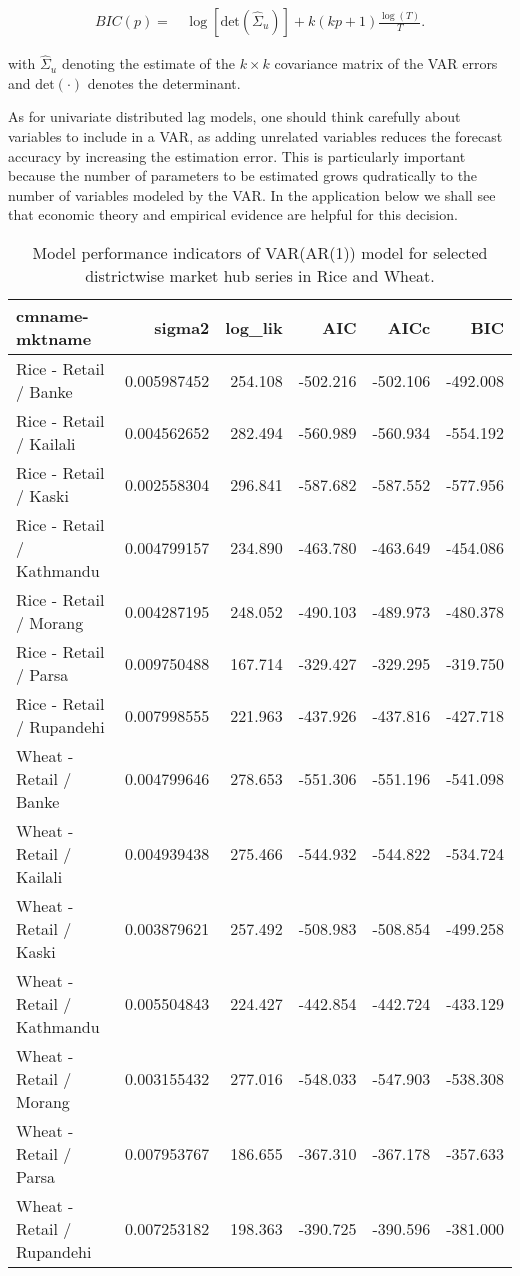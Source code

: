 \documentclass[12pt,]{article}
\begin{document}
\[
\begin{aligned}
  BIC(p) =& \, \log\left[\text{det}(\widehat{\Sigma}_u)\right] + k(kp+1) \frac{\log(T)}{T}.
\end{aligned}
\]

with \(\widehat{\Sigma}_u\) denoting the estimate of the \(k \times k\) covariance matrix of the VAR errors and \(\text{det}(\cdot)\) denotes the determinant.

As for univariate distributed lag models, one should think carefully about variables to include in a VAR, as adding unrelated variables reduces the forecast accuracy by increasing the estimation error. This is particularly important because the number of parameters to be estimated grows qudratically to the number of variables modeled by the VAR. In the application below we shall see that economic theory and empirical evidence are helpful for this decision.

\begin{longtable}[t]{lrrrrr}
\caption{\label{tab:retail-var-fit-tidy}Model performance indicators of VAR(AR(1)) model for selected districtwise market hub series in Rice and Wheat.}\\
\toprule
cmname-mktname & sigma2 & log\_lik & AIC & AICc & BIC\\
\midrule
Rice - Retail / Banke & 0.005987452 & 254.108 & -502.216 & -502.106 & -492.008\\
Rice - Retail / Kailali & 0.004562652 & 282.494 & -560.989 & -560.934 & -554.192\\
Rice - Retail / Kaski & 0.002558304 & 296.841 & -587.682 & -587.552 & -577.956\\
Rice - Retail / Kathmandu & 0.004799157 & 234.890 & -463.780 & -463.649 & -454.086\\
Rice - Retail / Morang & 0.004287195 & 248.052 & -490.103 & -489.973 & -480.378\\
\addlinespace
Rice - Retail / Parsa & 0.009750488 & 167.714 & -329.427 & -329.295 & -319.750\\
Rice - Retail / Rupandehi & 0.007998555 & 221.963 & -437.926 & -437.816 & -427.718\\
Wheat - Retail / Banke & 0.004799646 & 278.653 & -551.306 & -551.196 & -541.098\\
Wheat - Retail / Kailali & 0.004939438 & 275.466 & -544.932 & -544.822 & -534.724\\
Wheat - Retail / Kaski & 0.003879621 & 257.492 & -508.983 & -508.854 & -499.258\\
\addlinespace
Wheat - Retail / Kathmandu & 0.005504843 & 224.427 & -442.854 & -442.724 & -433.129\\
Wheat - Retail / Morang & 0.003155432 & 277.016 & -548.033 & -547.903 & -538.308\\
Wheat - Retail / Parsa & 0.007953767 & 186.655 & -367.310 & -367.178 & -357.633\\
Wheat - Retail / Rupandehi & 0.007253182 & 198.363 & -390.725 & -390.596 & -381.000\\
\bottomrule
\end{longtable}
\end{document}
